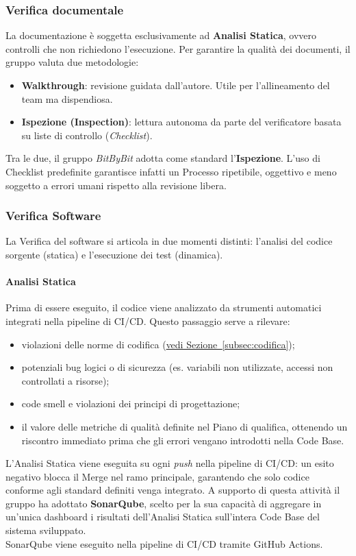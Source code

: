 \documentclass[a4paper,12pt]{article}
\newcommand{\ignoreglossary}{}
\begin{document}
\subsubsection{\ignoreglossary{Verifica} documentale}
La documentazione è soggetta esclusivamente ad \textbf{Analisi Statica}, ovvero controlli che non richiedono l'esecuzione.
Per garantire la qualità dei documenti, il gruppo valuta due metodologie:
\begin{itemize}
    \item \textbf{Walkthrough}: revisione guidata dall'autore. Utile per l'allineamento del team ma dispendiosa.
    \item \textbf{Ispezione (Inspection)}: lettura autonoma da parte del verificatore basata su liste di controllo (\textit{Checklist}).
\end{itemize}
Tra le due, il gruppo \textit{BitByBit} adotta come standard l'\textbf{Ispezione}. L'uso di Checklist predefinite garantisce infatti un Processo ripetibile, oggettivo e meno soggetto a errori umani rispetto alla revisione libera.

\subsubsection{\ignoreglossary{Verifica} Software}
La Verifica del software si articola in due momenti distinti: l'analisi del codice sorgente (statica) e l'esecuzione dei test (dinamica).

\paragraph{\ignoreglossary{Analisi Statica}} \label{par:analisi-statica}
Prima di essere eseguito, il codice viene analizzato da strumenti automatici integrati nella pipeline di CI/CD.
Questo passaggio serve a rilevare:
\begin{itemize}
    \item violazioni delle norme di codifica (\hyperref[subsec:codifica]{vedi Sezione~\ref*{subsec:codifica}});
    \item potenziali bug logici o di sicurezza (es. variabili non utilizzate, accessi non controllati a risorse);
    \item code smell e violazioni dei principi di progettazione;
    \item il valore delle metriche di qualità definite nel Piano di qualifica, ottenendo un riscontro immediato prima che gli errori vengano introdotti nella Code Base.
\end{itemize}
L'Analisi Statica viene eseguita su ogni \textit{push} nella pipeline di CI/CD: un esito negativo blocca il Merge nel 
ramo principale, garantendo che solo codice conforme agli standard definiti venga integrato.
A supporto di questa attività il gruppo ha adottato \textbf{SonarQube}, scelto per la sua capacità di aggregare in un'unica dashboard 
i risultati dell'Analisi Statica sull'intera Code Base del sistema sviluppato.\\
SonarQube viene eseguito nella pipeline di CI/CD tramite GitHub Actions.
\end{document}

